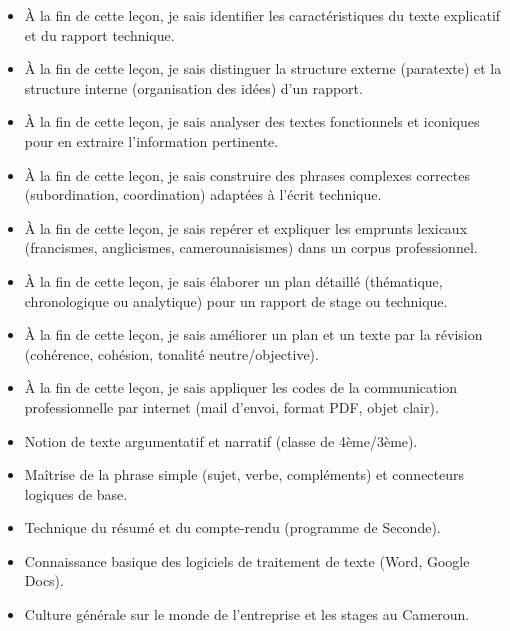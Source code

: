 \documentclass[11pt]{article}
\begin{document}
\begin{objectifs}
\begin{itemize}
\item À la fin de cette leçon, je sais identifier les caractéristiques du texte explicatif et du rapport technique.
\item À la fin de cette leçon, je sais distinguer la structure externe (paratexte) et la structure interne (organisation des idées) d'un rapport.
\item À la fin de cette leçon, je sais analyser des textes fonctionnels et iconiques pour en extraire l'information pertinente.
\item À la fin de cette leçon, je sais construire des phrases complexes correctes (subordination, coordination) adaptées à l'écrit technique.
\item À la fin de cette leçon, je sais repérer et expliquer les emprunts lexicaux (francismes, anglicismes, camerounaisismes) dans un corpus professionnel.
\item À la fin de cette leçon, je sais élaborer un plan détaillé (thématique, chronologique ou analytique) pour un rapport de stage ou technique.
\item À la fin de cette leçon, je sais améliorer un plan et un texte par la révision (cohérence, cohésion, tonalité neutre/objective).
\item À la fin de cette leçon, je sais appliquer les codes de la communication professionnelle par internet (mail d'envoi, format PDF, objet clair).
\end{itemize}
\end{objectifs}

\begin{prerequis}
\begin{itemize}
\item Notion de texte argumentatif et narratif (classe de 4ème/3ème).
\item Maîtrise de la phrase simple (sujet, verbe, compléments) et connecteurs logiques de base.
\item Technique du résumé et du compte-rendu (programme de Seconde).
\item Connaissance basique des logiciels de traitement de texte (Word, Google Docs).
\item Culture générale sur le monde de l'entreprise et les stages au Cameroun.
\end{itemize}
\end{prerequis}

\newpage
\end{document}
